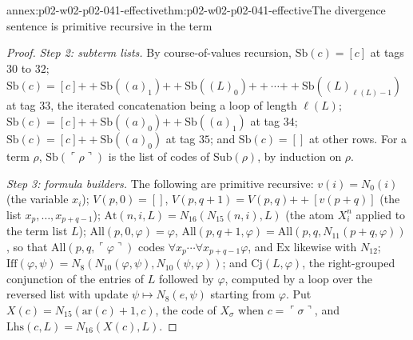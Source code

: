 \begin{annexitem}{annex:p02-w02-p02-041-effective}{thm:p02-w02-p02-041-effective}{The divergence sentence is primitive recursive in the term}
\begin{proof}
\emph{Step 2: subterm lists.}  By course-of-values recursion,
\(\mathrm{Sb}(c)=[c]\) at tags \(30\) to \(32\);
\(\mathrm{Sb}(c)=[c]\mathbin{+\!\!+}\mathrm{Sb}((a)_1)\mathbin{+\!\!+}\mathrm{Sb}((L)_0)\mathbin{+\!\!+}\cdots\mathbin{+\!\!+}\mathrm{Sb}((L)_{\ell(L)-1})\)
at tag \(33\), the iterated concatenation being a loop of length \(\ell(L)\);
\(\mathrm{Sb}(c)=[c]\mathbin{+\!\!+}\mathrm{Sb}((a)_0)\mathbin{+\!\!+}\mathrm{Sb}((a)_1)\) at
tag \(34\); \(\mathrm{Sb}(c)=[c]\mathbin{+\!\!+}\mathrm{Sb}((a)_0)\) at tag \(35\);
and \(\mathrm{Sb}(c)=[]\) at other rows.  For a term \(\rho\),
\(\mathrm{Sb}(\ulcorner\rho\urcorner)\) is the list of codes of
\(\mathrm{Sub}(\rho)\), by induction on \(\rho\).

\emph{Step 3: formula builders.}  The following are primitive recursive:
\(v(i)=N_0(i)\) (the variable \(x_i\));
\(V(p,0)=[]\), \(V(p,q+1)=V(p,q)\mathbin{+\!\!+}[v(p+q)]\) (the list
\(x_p,\ldots,x_{p+q-1}\));
\(\mathrm{At}(n,i,L)=N_{16}(N_{15}(n,i),L)\) (the atom \(X^n_i\) applied to
the term list \(L\));
\(\mathrm{All}(p,0,\varphi)=\varphi\),
\(\mathrm{All}(p,q+1,\varphi)=\mathrm{All}(p,q,N_{11}(p+q,\varphi))\), so that
\(\mathrm{All}(p,q,\ulcorner\varphi\urcorner)\) codes
\(\forall x_p\cdots\forall x_{p+q-1}\varphi\), and \(\mathrm{Ex}\) likewise with
\(N_{12}\);
\(\mathrm{Iff}(\varphi,\psi)=N_8(N_{10}(\varphi,\psi),N_{10}(\psi,\varphi))\);
and \(\mathrm{Cj}(L,\varphi)\), the right-grouped conjunction of the entries of
\(L\) followed by \(\varphi\), computed by a loop over the reversed list with
update \(\psi\mapsto N_8(e,\psi)\) starting from \(\varphi\).
Put \(X(c)=N_{15}(\mathrm{ar}(c)+1,c)\), the code of \(X_\sigma\) when
\(c=\ulcorner\sigma\urcorner\), and \(\mathrm{Lhs}(c,L)=N_{16}(X(c),L)\).


\end{proof}
\end{annexitem}
